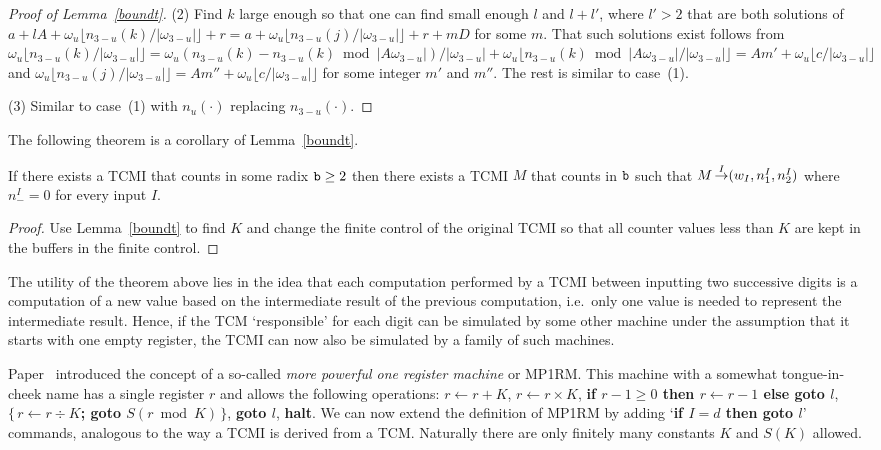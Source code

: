\documentclass[12pt]{article}
\begin{document}
\begin{proof}[Proof of Lemma~\ref{boundt}]
(2) Find $k$ large enough so that one can find small enough $l$ and
$l+l'$, where $l'>2$ that are both solutions of $a+lA+\omega_u\lfloor
n_{3-u}(k)/|\omega_{3-u}|\rfloor+r=a+\omega_u\lfloor
n_{3-u}(j)/|\omega_{3-u}|\rfloor+r+mD$ for some $m$. That such
solutions exist follows from $\omega_u\lfloor
n_{3-u}(k)/|\omega_{3-u}|\rfloor=\omega_u(n_{3-u}(k)-n_{3-u}(k)\bmod|A\omega_{3-u}|)/|\omega_{3-u}|+\omega_u\lfloor
n_{3-u}(k)\bmod|A\omega_{3-u}|/|\omega_{3-u}|\rfloor=Am'+\omega_u\lfloor
c/|\omega_{3-u}|\rfloor$ and $\omega_u\lfloor
n_{3-u}(j)/|\omega_{3-u}|\rfloor=Am''+\omega_u\lfloor
c/|\omega_{3-u}|\rfloor$ for some integer $m'$ and $m''$. The rest is
similar to case~(1).

(3) Similar to case~(1) with $n_u(\cdot)$ replacing $n_{3-u}(\cdot)$.
\end{proof}

The following theorem is a corollary of Lemma~\ref{boundt}.
\begin{theorem}\label{tcmired}
If there exists a TCMI that counts in some radix ${\tt b}\geq2$ then
there exists a TCMI $M$ that counts in ${\tt b}$ such that
$M\mathop{\to}\limits^{I}(w_I,n^I_1, n^I_2)$ where $n^I_-=0$ for every input $I$.
\end{theorem}
\begin{proof}
Use Lemma~\ref{boundt} to find $K$ and change the finite control of the
original TCMI so that all counter values less than $K$ are kept in the
buffers in the finite control.
\end{proof}

The utility of the theorem above lies in the idea that each
computation performed by a TCMI between inputting two successive
digits is a computation of a new value based on the intermediate
result of the previous computation, i.e.\ only one value is needed to
represent the intermediate result. Hence, if the TCM `responsible' for
each digit can be
simulated by some other machine under the assumption that it starts
with one empty register, the TCMI can now also be simulated by a family of
such machines.

Paper~\cite{Schroep} introduced the concept of a so-called {\it more
  powerful one register machine\/} or MP1RM. This machine with a
somewhat tongue-in-cheek name has a single register $r$ and allows the
following operations: $r\leftarrow r+K$, $r\leftarrow r\times K$, 
{\bf if $r-1\geq0$ then $r\leftarrow r-1$ else goto $l$}, {\bf
  $\{\,r\leftarrow r\div K${\rm;} goto $S(r\bmod K)\,\}$}, {\bf goto $l$}, {\bf
  halt}. We can now extend the definition of MP1RM by adding `{\bf if
$I=d$ then goto $l$}' commands, analogous to the way 
a TCMI is derived from a TCM. Naturally there are only finitely
many constants $K$ and $S(K)$ allowed.
\end{document}

